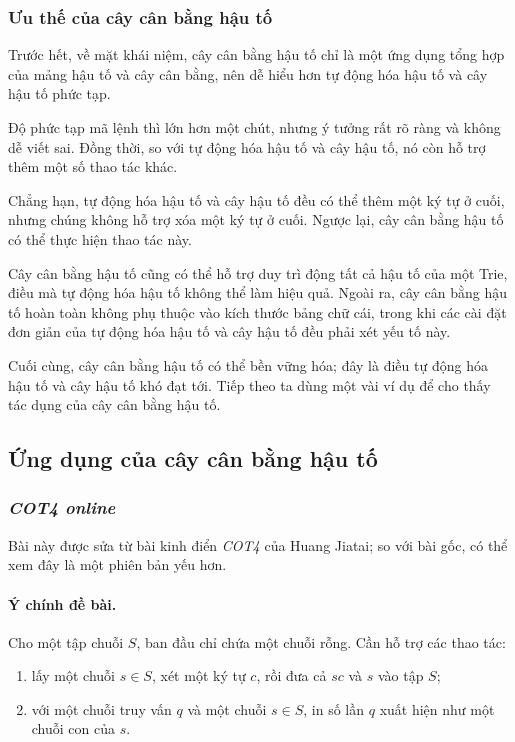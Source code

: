 \documentclass[11pt]{article}
\begin{document}
\subsubsection{Ưu thế của cây cân bằng hậu tố}

Trước hết, về mặt khái niệm, cây cân bằng hậu tố chỉ là một ứng dụng tổng
hợp của mảng hậu tố và cây cân bằng, nên dễ hiểu hơn tự động hóa hậu tố và
cây hậu tố phức tạp.

Độ phức tạp mã lệnh thì lớn hơn một chút, nhưng ý tưởng rất rõ ràng và không
dễ viết sai. Đồng thời, so với tự động hóa hậu tố và cây hậu tố, nó còn hỗ
trợ thêm một số thao tác khác.

Chẳng hạn, tự động hóa hậu tố và cây hậu tố đều có thể thêm một ký tự ở
cuối, nhưng chúng không hỗ trợ xóa một ký tự ở cuối. Ngược lại, cây cân bằng
hậu tố có thể thực hiện thao tác này.

Cây cân bằng hậu tố cũng có thể hỗ trợ duy trì động tất cả hậu tố của một
Trie, điều mà tự động hóa hậu tố không thể làm hiệu quả. Ngoài ra, cây cân
bằng hậu tố hoàn toàn không phụ thuộc vào kích thước bảng chữ cái, trong khi
các cài đặt đơn giản của tự động hóa hậu tố và cây hậu tố đều phải xét yếu
tố này.

Cuối cùng, cây cân bằng hậu tố có thể bền vững hóa; đây là điều tự động hóa
hậu tố và cây hậu tố khó đạt tới. Tiếp theo ta dùng một vài ví dụ để cho
thấy tác dụng của cây cân bằng hậu tố.

\subsection{Ứng dụng của cây cân bằng hậu tố}

\subsubsection{\emph{COT4 online}}

Bài này được sửa từ bài kinh điển \emph{COT4} của Huang Jiatai; so với bài
gốc, có thể xem đây là một phiên bản yếu hơn.

\paragraph{Ý chính đề bài.}
Cho một tập chuỗi \(S\), ban đầu chỉ chứa một chuỗi rỗng. Cần hỗ trợ các
thao tác:
\begin{enumerate}
  \item lấy một chuỗi \(s\in S\), xét một ký tự \(c\), rồi đưa cả \(sc\) và
  \(s\) vào tập \(S\);
  \item với một chuỗi truy vấn \(q\) và một chuỗi \(s\in S\), in số lần
  \(q\) xuất hiện như một chuỗi con của \(s\).
\end{enumerate}
\end{document}
